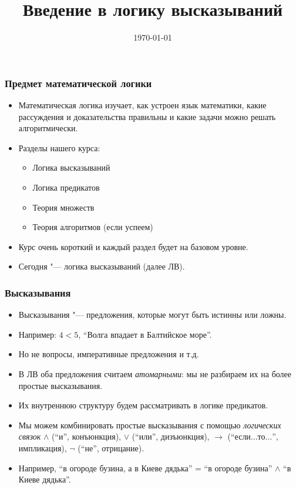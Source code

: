 \documentclass[10pt]{beamer}
\title{Введение в логику высказываний}
\date{\today}
\begin{document}
\begin{frame}[plain]
\maketitle
\end{frame}

\begin{frame}
\frametitle{Предмет математической логики}
\begin{itemize}
    \item Математическая логика изучает, как устроен язык математики, какие рассуждения и доказательства правильны и какие задачи можно решать алгоритмически.
    \item Разделы нашего курса:
    \begin{itemize}
        \item Логика высказываний
        \item Логика предикатов
        \item Теория множеств
        \item Теория алгоритмов (если успеем)
    \end{itemize}
    \item Курс очень короткий и каждый раздел будет на базовом уровне.
    \pause
    \item Сегодня "--- логика высказываний (далее ЛВ). 
\end{itemize}
\end{frame}

\begin{frame}
    \frametitle{Высказывания}
    \begin{itemize}
        \item Высказывания "--- предложения, которые могут быть истинны или ложны.
        \item Например: $4<5$, \enquote{Волга впадает в Балтийское море}.
        \item Но не вопросы, императивные предложения и т.д.
        \pause
        \item В ЛВ оба предложения считаем \emph{атомарными}: мы не разбираем их на более простые высказывания.
        \item Их внутреннюю структуру будем рассматривать в логике предикатов.
        \pause
        \item Мы можем комбинировать простые высказывания с помощью \emph{логических связок} $\land$ (\enquote{и}, конъюнкция), $\lor$ (\enquote{или}, дизъюнкция), $\to$ (\enquote{если$\ldots$то$\ldots$}, импликация), $\neg$ (\enquote{не}, отрицание).
        \pause
        \item Например, \enquote{в огороде бузина, а в Киеве дядька} = \enquote{в огороде бузина} $\land$ \enquote{в Киеве дядька}.
    \end{itemize}
\end{frame}
\end{document}
